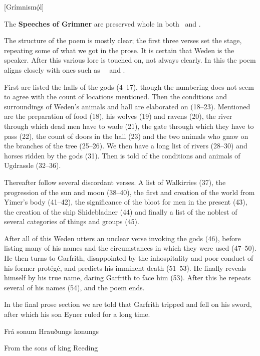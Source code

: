 [Grímnismǫ́l]


The \textbf{Speeches of Grimner} are preserved whole in both \Regius\ and \AM.

The structure of the poem is mostly clear; the first three verses set the stage, repeating some of what we got in the prose. It is certain that Weden is the speaker. After this various lore is touched on, not always clearly. In this the poem aligns closely with ones such as \Vafthrudnismal\, \Sigrdrifumal\ and \Allvismal.

First are listed the halls of the gods (4–17), though the numbering does not seem to agree with the count of locations mentioned. Then the conditions and surroundings of Weden’s animals and hall are elaborated on (18–23). Mentioned are the preparation of food (18), his wolves (19) and ravens (20), the river through which dead men have to wade (21), the gate through which they have to pass (22), the count of doors in the hall (23) and the two animals who gnaw on the branches of the tree (25–26). We then have a long list of rivers (28–30) and horses ridden by the gods (31). Then is told of the conditions and animals of Ugdrassle (32–36).

Thereafter follow several discordant verses. A list of Walkirries (37), the progression of the sun and moon (38–40), the first  and creation of the world from Yimer’s body (41–42), the significance of the bloot for men in the present (43), the creation of the ship Shidebladner (44) and finally a list of the noblest of several categories of things and groups (45).

After all of this Weden utters an unclear verse invoking the gods (46), before listing many of his names and the circumstances in which they were used (47–50). He then turns to Garfrith, disappointed by the inhospitality and poor conduct of his former protégé, and predicts his imminent death (51–53). He finally reveals himself by his true name, daring Garfrith to face him (53). After this he repeats several of his names (54), and the poem ends.

In the final prose section we are told that Garfrith tripped and fell on his sword, after which his son Eyner ruled for a long time.



Frá sonum Hrauðungs konungs

From the sons of king Reeding

